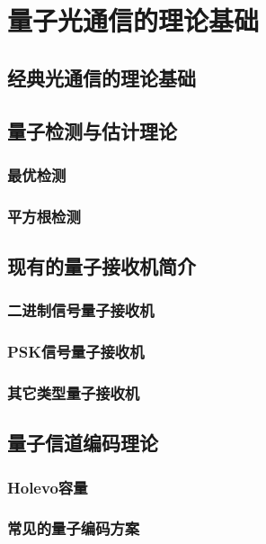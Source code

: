 \chapter{量子光通信的理论基础}

\section{经典光通信的理论基础}



\section{量子检测与估计理论}

\subsection{最优检测}

\subsection{平方根检测}



\section{现有的量子接收机简介}

\subsection{二进制信号量子接收机}

\subsection{PSK信号量子接收机}

\subsection{其它类型量子接收机}


\section{量子信道编码理论}

\subsection{Holevo容量}

\subsection{常见的量子编码方案}

